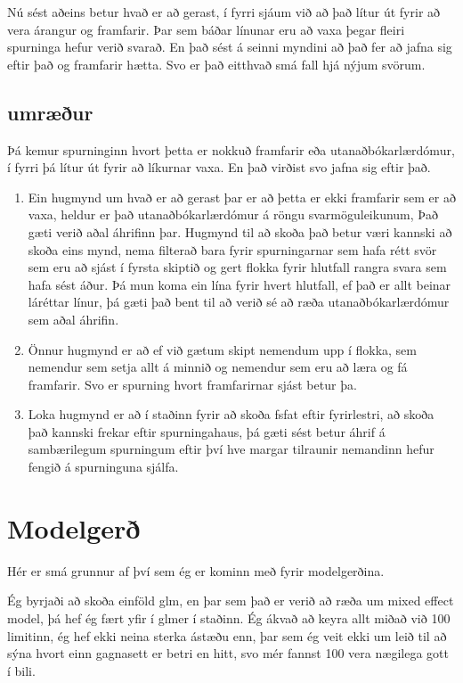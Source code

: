 \documentclass[
]{article}
\providecommand{\tightlist}{%
  \setlength{\itemsep}{0pt}\setlength{\parskip}{0pt}}
\begin{document}
Nú sést aðeins betur hvað er að gerast, í fyrri sjáum við að það lítur út fyrir að vera árangur og framfarir. Þar sem báðar línunar eru að vaxa þegar fleiri spurninga hefur verið svarað. En það sést á seinni myndini að það fer að jafna sig eftir það og framfarir hætta. Svo er það eitthvað smá fall hjá nýjum svörum.

\hypertarget{umruxe6uxf0ur}{%
\subsection{umræður}\label{umruxe6uxf0ur}}

Þá kemur spurninginn hvort þetta er nokkuð framfarir eða utanaðbókarlærdómur, í fyrri þá lítur út fyrir að líkurnar vaxa. En það virðist svo jafna sig eftir það.

\begin{enumerate}
\def\labelenumi{\arabic{enumi}.}
\tightlist
\item
  Ein hugmynd um hvað er að gerast þar er að þetta er ekki framfarir sem er að vaxa, heldur er það utanaðbókarlærdómur á röngu svarmöguleikunum, Það gæti verið aðal áhrifinn þar. Hugmynd til að skoða það betur væri kannski að skoða eins mynd, nema filterað bara fyrir spurningarnar sem hafa rétt svör sem eru að sjást í fyrsta skiptið og gert flokka fyrir hlutfall rangra svara sem hafa sést áður. Þá mun koma ein lína fyrir hvert hlutfall, ef það er allt beinar láréttar línur, þá gæti það bent til að verið sé að ræða utanaðbókarlærdómur sem aðal áhrifin.
\item
  Önnur hugmynd er að ef við gætum skipt nemendum upp í flokka, sem nemendur sem setja allt á minnið og nemendur sem eru að læra og fá framfarir. Svo er spurning hvort framfarirnar sjást betur þa.
\item
  Loka hugmynd er að í staðinn fyrir að skoða fsfat eftir fyrirlestri, að skoða það kannski frekar eftir spurningahaus, þá gæti sést betur áhrif á sambærilegum spurningum eftir því hve margar tilraunir nemandinn hefur fengið á spurninguna sjálfa.
\end{enumerate}

\hypertarget{modelgeruxf0}{%
\section{Modelgerð}\label{modelgeruxf0}}

Hér er smá grunnur af því sem ég er kominn með fyrir modelgerðina.

Ég byrjaði að skoða einföld glm, en þar sem það er verið að ræða um mixed effect model, þá hef ég fært yfir í glmer í staðinn. Ég ákvað að keyra allt miðað við 100 limitinn, ég hef ekki neina sterka ástæðu enn, þar sem ég veit ekki um leið til að sýna hvort einn gagnasett er betri en hitt, svo mér fannst 100 vera nægilega gott í bili.
\end{document}
